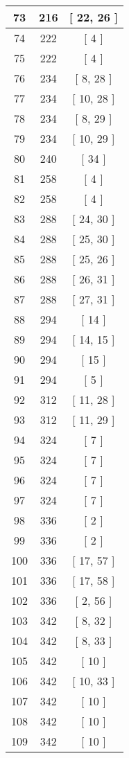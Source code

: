 \begin{center}
\begin{longtable}[H]{|| c c c ||}
\hline
73 & 216 & [ 22, 26 ] \\ 
\hline
74 & 222 & [ 4 ] \\ 
\hline
75 & 222 & [ 4 ] \\ 
\hline
76 & 234 & [ 8, 28 ] \\ 
\hline
77 & 234 & [ 10, 28 ] \\ 
\hline
78 & 234 & [ 8, 29 ] \\ 
\hline
79 & 234 & [ 10, 29 ] \\ 
\hline
80 & 240 & [ 34 ] \\ 
\hline
81 & 258 & [ 4 ] \\ 
\hline
82 & 258 & [ 4 ] \\ 
\hline
83 & 288 & [ 24, 30 ] \\ 
\hline
84 & 288 & [ 25, 30 ] \\ 
\hline
85 & 288 & [ 25, 26 ] \\ 
\hline
86 & 288 & [ 26, 31 ] \\ 
\hline
87 & 288 & [ 27, 31 ] \\ 
\hline
88 & 294 & [ 14 ] \\ 
\hline
89 & 294 & [ 14, 15 ] \\ 
\hline
90 & 294 & [ 15 ] \\ 
\hline
91 & 294 & [ 5 ] \\ 
\hline
92 & 312 & [ 11, 28 ] \\ 
\hline
93 & 312 & [ 11, 29 ] \\ 
\hline
94 & 324 & [ 7 ] \\ 
\hline
95 & 324 & [ 7 ] \\ 
\hline
96 & 324 & [ 7 ] \\ 
\hline
97 & 324 & [ 7 ] \\ 
\hline
98 & 336 & [ 2 ] \\ 
\hline
99 & 336 & [ 2 ] \\ 
\hline
100 & 336 & [ 17, 57 ] \\ 
\hline
101 & 336 & [ 17, 58 ] \\ 
\hline
102 & 336 & [ 2, 56 ] \\ 
\hline
103 & 342 & [ 8, 32 ] \\ 
\hline
104 & 342 & [ 8, 33 ] \\ 
\hline
105 & 342 & [ 10 ] \\ 
\hline
106 & 342 & [ 10, 33 ] \\ 
\hline
107 & 342 & [ 10 ] \\ 
\hline
108 & 342 & [ 10 ] \\ 
\hline
109 & 342 & [ 10 ] \\ 

\end{longtable}
\end{center}
